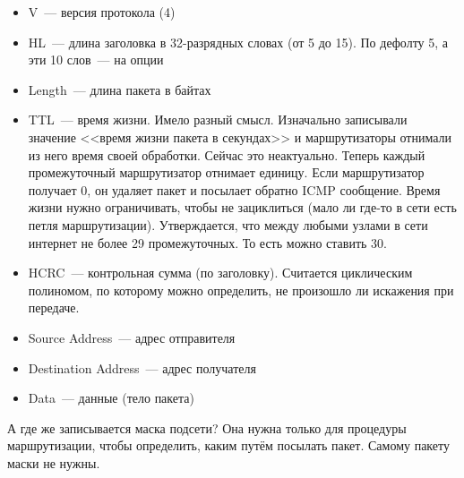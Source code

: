 
\begin{itemize}
    \item V~--- версия протокола (4)
    \item HL~--- длина заголовка в 32-разрядных словах (от 5 до 15). По дефолту 5, а эти 10 слов~--- на опции
    \item Length~--- длина пакета в байтах
    \item TTL~--- время жизни. Имело разный смысл. Изначально записывали значение <<время жизни пакета в секундах>> и маршрутизаторы отнимали из него время своей обработки. Сейчас это неактуально. Теперь каждый промежуточный маршрутизатор отнимает единицу. Если маршрутизатор получает 0, он удаляет пакет и посылает обратно ICMP сообщение. Время жизни нужно ограничивать, чтобы не зациклиться (мало ли где-то в сети есть петля маршрутизации). Утверждается, что между любыми узлами в сети интернет не более 29 промежуточных. То есть можно ставить 30.
    \item HCRC~--- контрольная сумма (по заголовку). Считается циклическим полиномом, по которому можно определить, не произошло ли искажения при передаче.
    \item Source Address~--- адрес отправителя
    \item Destination Address~--- адрес получателя
    \item Data~--- данные (тело пакета)
\end{itemize}

А где же записывается маска подсети? Она нужна только для процедуры маршрутизации, чтобы определить, каким путём посылать пакет. Самому пакету маски не нужны. 

